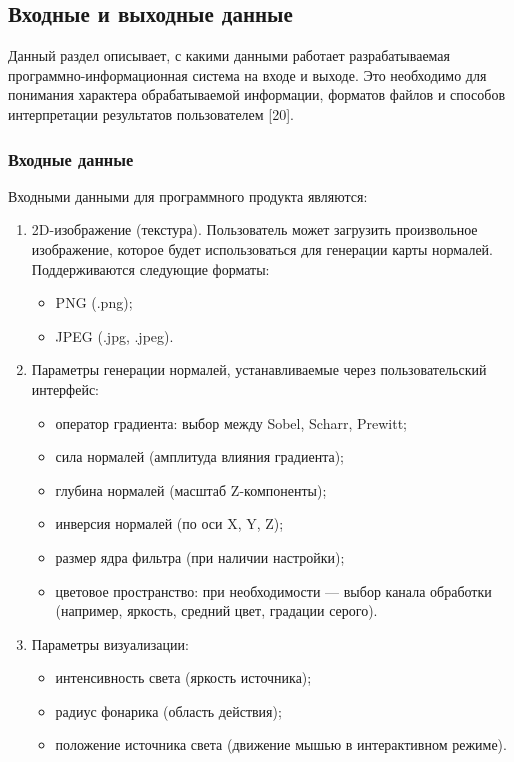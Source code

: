\subsection{Входные и выходные данные}

Данный раздел описывает, с какими данными работает разрабатываемая программно-информационная система на входе и выходе. Это необходимо для понимания характера обрабатываемой информации, форматов файлов и способов интерпретации результатов пользователем [20].
\subsubsection{Входные данные}

Входными данными для программного продукта являются:
\begin{enumerate}
	\item 2D-изображение (текстура). Пользователь может загрузить произвольное изображение, которое будет использоваться для генерации карты нормалей. Поддерживаются следующие форматы:
	\begin{itemize}
		\item PNG (.png);
		\item JPEG (.jpg, .jpeg).
	\end{itemize}
	\item Параметры генерации нормалей, устанавливаемые через пользовательский интерфейс:
	\begin{itemize}
		\item оператор градиента: выбор между Sobel, Scharr, Prewitt;
		\item сила нормалей (амплитуда влияния градиента);
		\item глубина нормалей (масштаб Z-компоненты);
		\item инверсия нормалей (по оси X, Y, Z);
		\item размер ядра фильтра (при наличии настройки);
		\item цветовое пространство: при необходимости — выбор канала обработки (например, яркость, средний цвет, градации серого).
	\end{itemize}	
	\item Параметры визуализации:
	\begin{itemize}
		\item интенсивность света (яркость источника);
		\item радиус фонарика (область действия);
		\item положение источника света (движение мышью в интерактивном режиме).
	\end{itemize}	
\end{enumerate}

